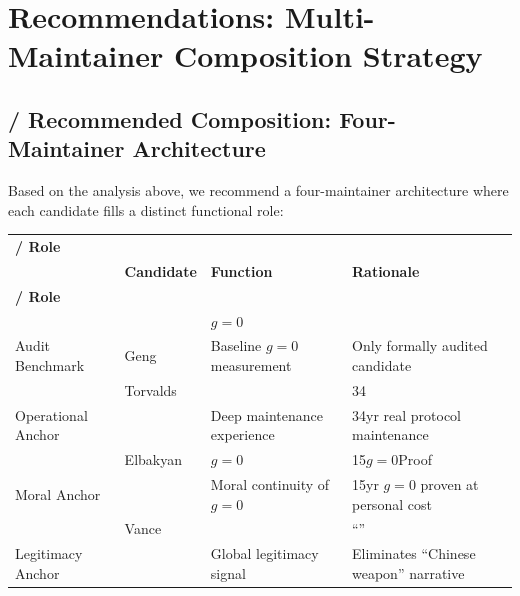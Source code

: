\documentclass[12pt,a4paper]{article}
\theoremstyle{remark}
\begin{document}
\newpage

\section{}
\section{Recommendations: Multi-Maintainer Composition Strategy}

\subsection{ / Recommended Composition: Four-Maintainer Architecture}

Based on the analysis above, we recommend a four-maintainer architecture
where each candidate fills a distinct functional role:

\begin{center}
\begin{longtable}{p{} p{} p{} p{}}
\toprule
\textbf{ / Role} & \textbf{} & \textbf{} & \textbf{} \\
 & \textbf{Candidate} & \textbf{Function} & \textbf{Rationale} \\
\midrule
\endfirsthead
\toprule
\textbf{ / Role} & \textbf{} & \textbf{} & \textbf{} \\
\midrule
\endhead
\bottomrule
\endfoot
\midrule
 &  & $g=0$ &  \\
Audit Benchmark & Geng & Baseline $g=0$ measurement & Only formally audited candidate \\
\midrule
 & Torvalds &  & 34 \\
Operational Anchor & & Deep maintenance experience & 34yr real protocol maintenance \\
\midrule
 & Elbakyan & $g=0$ & 15$g=0$Proof \\
Moral Anchor & & Moral continuity of $g=0$ & 15yr $g=0$ proven at personal cost \\
\midrule
 & Vance &  & “” \\
Legitimacy Anchor & & Global legitimacy signal & Eliminates ``Chinese weapon'' narrative \\
\bottomrule
\end{longtable}
\end{center}
\end{document}
